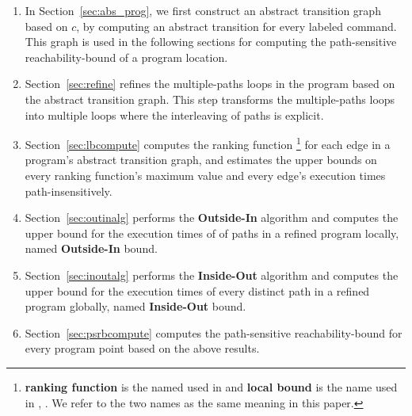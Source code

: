 \begin{enumerate}
\item  In Section~\ref{sec:abs_prog}, we first construct an abstract transition graph based on $c$, by computing an abstract transition 
for every labeled command. 
This graph is used in the following sections
for computing the path-sensitive reachability-bound of a program location.
\item Section~\ref{sec:refine}
refines the multiple-paths loops in the program
based on the abstract transition graph.
This step transforms the multiple-paths loops into multiple loops where
the interleaving of paths is explicit.
\item Section~\ref{sec:lbcompute} computes the ranking function  
\footnote{\textbf{ranking function} is the named used in \cite{SinnZV14}
and \textbf{local bound} is the name used in \cite{ZulegerGSV11}, \cite{sinn2017complexity}.
We refer to the two names as the same meaning in this paper.} for each edge in a program's abstract transition graph,
and estimates the upper bounds on every ranking function's maximum value and every edge's execution times path-insensitively.
\item Section~\ref{sec:outinalg} performs the \textbf{Outside-In} algorithm and computes
the upper bound for the execution times of  of paths in a refined program locally, named \textbf{Outside-In} bound.
\item Section~\ref{sec:inoutalg} performs the \textbf{Inside-Out} algorithm and 
computes the upper bound for the execution times of
every distinct path in a refined program globally, named \textbf{Inside-Out} bound.
\item Section~\ref{sec:psrbcompute} computes the path-sensitive reachability-bound for every program point
based on the above results.
\end{enumerate}
